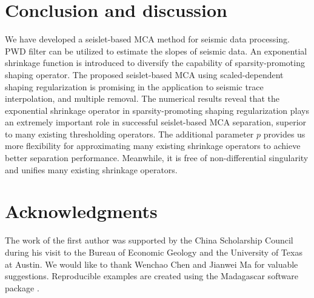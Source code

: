 

  
\section{Conclusion and discussion}

We have developed a seislet-based MCA method for seismic data processing. PWD filter can be utilized to estimate the slopes of seismic data. An exponential shrinkage function is introduced to diversify the capability of sparsity-promoting shaping operator. The proposed seislet-based MCA using scaled-dependent shaping regularization is promising in the application to seismic trace interpolation, and multiple removal. The numerical results reveal that the exponential shrinkage operator in sparsity-promoting shaping regularization plays an extremely important role in successful seislet-based MCA separation, superior to many existing thresholding operators. The additional parameter $p$ provides us more flexibility for approximating many existing shrinkage operators to achieve better separation performance. Meanwhile, it is free of non-differential singularity and unifies many existing shrinkage operators. 



\section*{Acknowledgments}

The work of the first author was supported by the China Scholarship Council during his visit to the Bureau of Economic Geology and the University of Texas at Austin. We would like to thank Wenchao Chen and Jianwei Ma for valuable suggestions. Reproducible examples are created using the  Madagascar software package \citep{m8r}.

